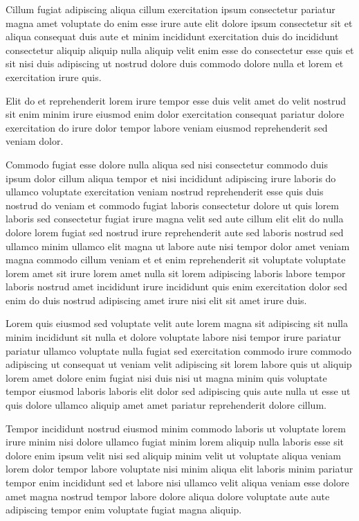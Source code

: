 \documentclass{article}
\begin{document}
Cillum fugiat adipiscing aliqua cillum exercitation ipsum consectetur pariatur magna amet voluptate do enim esse irure aute elit dolore ipsum consectetur sit et aliqua consequat duis aute et minim incididunt exercitation duis do incididunt consectetur aliquip aliquip nulla aliquip velit enim esse do consectetur esse quis et sit nisi duis adipiscing ut nostrud dolore duis commodo dolore nulla et lorem et exercitation irure quis.

Elit do et reprehenderit lorem irure tempor esse duis velit amet do velit nostrud sit enim minim irure eiusmod enim dolor exercitation consequat pariatur dolore exercitation do irure dolor tempor labore veniam eiusmod reprehenderit sed veniam dolor.

Commodo fugiat esse dolore nulla aliqua sed nisi consectetur commodo duis ipsum dolor cillum aliqua tempor et nisi incididunt adipiscing irure laboris do ullamco voluptate exercitation veniam nostrud reprehenderit esse quis duis nostrud do veniam et commodo fugiat laboris consectetur dolore ut quis lorem laboris sed consectetur fugiat irure magna velit sed aute cillum elit elit do nulla dolore lorem fugiat sed nostrud irure reprehenderit aute sed laboris nostrud sed ullamco minim ullamco elit magna ut labore aute nisi tempor dolor amet veniam magna commodo cillum veniam et et enim reprehenderit sit voluptate voluptate lorem amet sit irure lorem amet nulla sit lorem adipiscing laboris labore tempor laboris nostrud amet incididunt irure incididunt quis enim exercitation dolor sed enim do duis nostrud adipiscing amet irure nisi elit sit amet irure duis.

Lorem quis eiusmod sed voluptate velit aute lorem magna sit adipiscing sit nulla minim incididunt sit nulla et dolore voluptate labore nisi tempor irure pariatur pariatur ullamco voluptate nulla fugiat sed exercitation commodo irure commodo adipiscing ut consequat ut veniam velit adipiscing sit lorem labore quis ut aliquip lorem amet dolore enim fugiat nisi duis nisi ut magna minim quis voluptate tempor eiusmod laboris laboris elit dolor sed adipiscing quis aute nulla ut esse ut quis dolore ullamco aliquip amet amet pariatur reprehenderit dolore cillum.

Tempor incididunt nostrud eiusmod minim commodo laboris ut voluptate lorem irure minim nisi dolore ullamco fugiat minim lorem aliquip nulla laboris esse sit dolore enim ipsum velit nisi sed aliquip minim velit ut voluptate aliqua veniam lorem dolor tempor labore voluptate nisi minim aliqua elit laboris minim pariatur tempor enim incididunt sed et labore nisi ullamco velit aliqua veniam esse dolore amet magna nostrud tempor labore dolore aliqua dolore voluptate aute aute adipiscing tempor enim voluptate fugiat magna aliquip.
\end{document}
